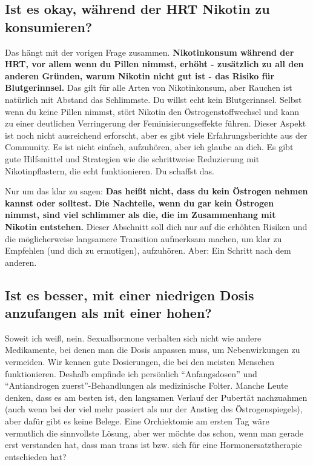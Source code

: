 \documentclass{article}
\begin{document}
\subsection{Ist es okay, während der HRT Nikotin zu konsumieren?}\label{11-2}

Das hängt mit der vorigen Frage zusammen. \textbf{Nikotinkonsum während der HRT, vor allem wenn du Pillen nimmst, erhöht - zusätzlich zu all den anderen Gründen, warum Nikotin nicht gut ist - das Risiko für Blutgerinnsel.} Das gilt für alle Arten von Nikotinkonsum, aber Rauchen ist natürlich mit Abstand das Schlimmste. Du willst echt kein Blutgerinnsel. Selbst wenn du keine Pillen nimmst, stört Nikotin den Östrogenstoffwechsel und kann zu einer deutlichen Verringerung der Feminisierungseffekte führen. Dieser Aspekt ist noch nicht ausreichend erforscht, aber es gibt viele Erfahrungsberichte aus der Community. Es ist nicht einfach, aufzuhören, aber ich glaube an dich. Es gibt gute Hilfsmittel und Strategien wie die schrittweise Reduzierung mit Nikotinpflastern, die echt funktionieren. Du schaffst das.

Nur um das klar zu sagen: \textbf{Das heißt nicht, dass du kein Östrogen nehmen kannst oder solltest. Die Nachteile, wenn du gar kein Östrogen nimmst, sind viel schlimmer als die, die im Zusammenhang mit Nikotin entstehen.} Dieser Abschnitt soll dich nur auf die erhöhten Risiken und die möglicherweise langsamere Transition aufmerksam machen, um klar zu Empfehlen (und dich zu ermutigen), aufzuhören. Aber: Ein Schritt nach dem anderen.

\subsection{Ist es besser, mit einer niedrigen Dosis anzufangen als mit einer hohen?}

Soweit ich weiß, nein. Sexualhormone verhalten sich nicht wie andere Medikamente, bei denen man die Dosis anpassen muss, um Nebenwirkungen zu vermeiden. Wir kennen gute Dosierungen, die bei den meisten Menschen funktionieren. Deshalb empfinde ich persönlich “Anfangsdosen” und “Antiandrogen zuerst”-Behandlungen als medizinische Folter. Manche Leute denken, dass es am besten ist, den langsamen Verlauf der Pubertät nachzuahmen (auch wenn bei der viel mehr passiert als nur der Anstieg des Östrogenspiegels), aber dafür gibt es keine Belege. Eine Orchiektomie am ersten Tag wäre vermutlich die sinnvollste Lösung, aber wer möchte das schon, wenn man gerade erst verstanden hat, dass man trans ist bzw. sich für eine Hormonersatztherapie entschieden hat?
\end{document}
